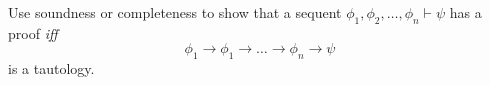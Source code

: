 Use soundness or completeness to show that a sequent $\phi_1,\phi_2,\ldots,\phi_n \vdash \psi$ 
has a proof \textit{iff}
$$\phi_1\rightarrow\phi_1\rightarrow\ldots\rightarrow\phi_n\rightarrow\psi$$
is a tautology.